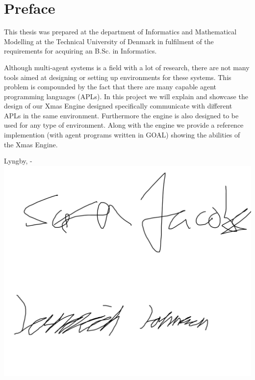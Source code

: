 \chapter{Preface}

This thesis was prepared at the department of Informatics and Mathematical Modelling at the Technical University of Denmark in fulfilment of the
requirements for acquiring an B.Sc. in Informatics.

Although multi-agent systems is a field with a lot of research, there are not many tools aimed at designing or setting up environments for these systems. This problem is compounded by the fact that there are many capable agent programming languages (APLs). In this project we will explain and showcase the design of our Xmas Engine designed specifically communicate with different APLs in the same environment. Furthermore the engine is also designed to be used for any type of environment. Along with the engine we provide a reference implemention (with agent programs written in GOAL) showing the abilities of the Xmas Engine.
\vspace{20mm}
\begin{center}
    \hspace{20mm} Lyngby, \thesishandin-\thesisyear
    \vspace{5mm}
    \newline
    \includegraphics[scale=0.5]{figures/SignatureDummy}
\end{center}
\begin{flushright}
    \thesisauthor
\end{flushright}

